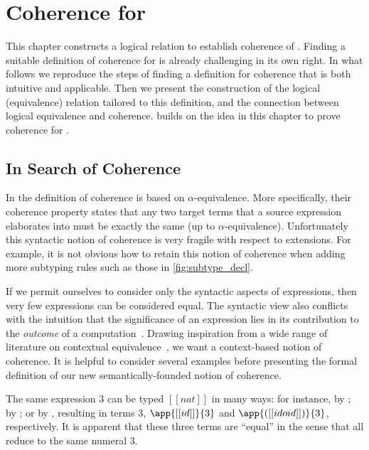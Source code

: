 
\chapter{Coherence for \namee}
\label{chap:coherence:simple}

This chapter constructs a logical relation to
establish coherence of \namee. Finding a
suitable definition of coherence for \namee is already challenging in its own
right. In what follows we reproduce the steps of finding a definition for coherence
that is both intuitive and applicable. Then we present the
construction of the logical (equivalence) relation tailored to this
definition, and the connection between logical equivalence and coherence.
 builds on the idea in this chapter to prove coherence for
\fnamee.


\section{In Search of Coherence}

In \oname the definition of coherence is based on
$\alpha$-equivalence. More specifically, their coherence property states that
any two target terms that a source expression elaborates into must be exactly the same (up to
$\alpha$-equivalence). Unfortunately this syntactic notion of coherence is
very fragile with respect to extensions.
For example, it is not obvious how to retain this notion of coherence when adding more subtyping
rules such as those in \cref{fig:subtype_decl}.

If we permit ourselves to consider only the syntactic aspects of expressions,
then very few expressions can be considered equal. The syntactic view also conflicts
with the intuition that the significance of an expression lies in its
contribution to the \textit{outcome} of a computation~\cite{Harper_2016}.
Drawing inspiration from a wide range of literature on contextual
equivalence~\cite{morris1969lambda}, we want a context-based notion of
coherence. It is helpful to consider several examples before presenting the
formal definition of our new semantically-founded notion of coherence.

\begin{example} \label{eg:1}
The same \namee expression $3$ can be typed $[[nat]]$ in many ways: for instance, by ; by
; or by , resulting in \tname
terms $3$, $\app{[[id]]}{3}$ and $\app{([[id o id]])}{3}$, respectively. It is apparent
that these three \tname terms are ``equal'' in the sense that all reduce to the
same numeral $3$.
\end{example}


